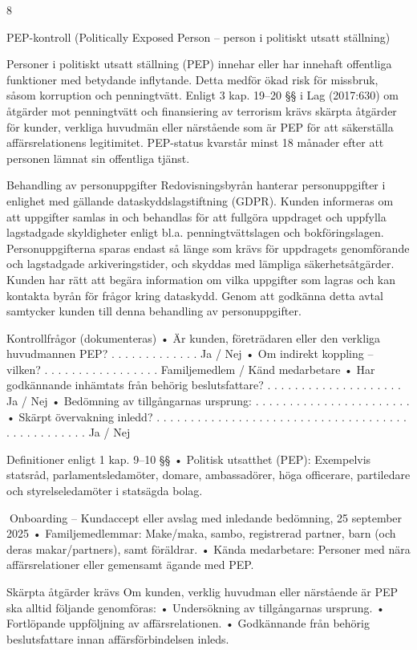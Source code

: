 8

PEP-kontroll (Politically Exposed Person – person i
politiskt utsatt ställning)

Personer i politiskt utsatt ställning (PEP) innehar eller har innehaft offentliga funktioner
med betydande inflytande. Detta medför ökad risk för missbruk, såsom korruption och
penningtvätt.
Enligt 3 kap. 19–20 §§ i Lag (2017:630) om åtgärder mot penningtvätt och finansiering
av terrorism krävs skärpta åtgärder för kunder, verkliga huvudmän eller närstående som
är PEP för att säkerställa affärsrelationens legitimitet.
PEP-status kvarstår minst 18 månader efter att personen lämnat sin offentliga tjänst.

Behandling av personuppgifter
Redovisningsbyrån hanterar personuppgifter i enlighet med gällande dataskyddslagstiftning (GDPR). Kunden informeras om att uppgifter samlas in och behandlas för att fullgöra uppdraget och uppfylla lagstadgade skyldigheter enligt bl.a. penningtvättslagen och
bokföringslagen.
Personuppgifterna sparas endast så länge som krävs för uppdragets genomförande och
lagstadgade arkiveringstider, och skyddas med lämpliga säkerhetsåtgärder. Kunden har
rätt att begära information om vilka uppgifter som lagras och kan kontakta byrån för
frågor kring dataskydd.
Genom att godkänna detta avtal samtycker kunden till denna behandling av personuppgifter.

Kontrollfrågor (dokumenteras)
• Är kunden, företrädaren eller den verkliga huvudmannen PEP? . . . . . . . . . . . . . Ja / Nej
• Om indirekt koppling – vilken? . . . . . . . . . . . . . . . . . Familjemedlem / Känd medarbetare
• Har godkännande inhämtats från behörig beslutsfattare? . . . . . . . . . . . . . . . . . . . . Ja / Nej
• Bedömning av tillgångarnas ursprung: . . . . . . . . . . . . . . . . . . . . . . .
• Skärpt övervakning inledd? . . . . . . . . . . . . . . . . . . . . . . . . . . . . . . . . . . . . . . . . . . . . . . . . . Ja / Nej

Definitioner enligt 1 kap. 9–10 §§
• Politisk utsatthet (PEP): Exempelvis statsråd, parlamentsledamöter, domare, ambassadörer, höga officerare, partiledare och styrelseledamöter i statsägda bolag.

Onboarding – Kundaccept eller avslag med inledande bedömning,
25 september 2025
• Familjemedlemmar: Make/maka, sambo, registrerad partner, barn (och deras makar/partners), samt föräldrar.
• Kända medarbetare: Personer med nära affärsrelationer eller gemensamt ägande med
PEP.

Skärpta åtgärder krävs
Om kunden, verklig huvudman eller närstående är PEP ska alltid följande genomföras:
• Undersökning av tillgångarnas ursprung.
• Fortlöpande uppföljning av affärsrelationen.
• Godkännande från behörig beslutsfattare innan affärsförbindelsen inleds.

